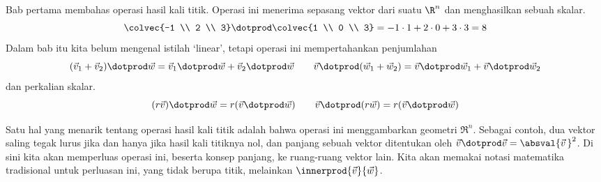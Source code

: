 \def\smashdp#1{{\setbox0=\hbox{$#1$}\dp0=0pt \box0\relax}}

Bab pertama membahas operasi hasil kali titik.
Operasi ini menerima sepasang vektor dari suatu $\R^n$ dan menghasilkan sebuah skalar.
\begin{equation*}
  \colvec{-1 \\ 2 \\ 3}\dotprod\colvec{1 \\ 0 \\ 3}
  =-1\cdot 1+2\cdot 0+3\cdot 3
  =8
\end{equation*}
Dalam bab itu kita belum mengenal istilah `linear', tetapi
operasi ini mempertahankan penjumlahan
\begin{equation*}
 (\vec{v}_1+\vec{v}_2)\dotprod\vec{w}=\vec{v}_1\dotprod\vec{w}
                                      +\vec{v}_2\dotprod\vec{w}
\qquad
 \vec{v}\dotprod(\vec{w}_1+\vec{w}_2)=\vec{v}\dotprod\vec{w}_1
                                      +\vec{v}\dotprod\vec{w}_2
\end{equation*}
dan perkalian skalar.
\begin{equation*}
 (r\vec{v})\dotprod\vec{w}=r(\vec{v}\dotprod\vec{w})
  \qquad
 \vec{v}\dotprod(r\vec{w})=r(\vec{v}\dotprod\vec{w})
\end{equation*}

Satu hal yang menarik tentang operasi hasil kali titik
adalah bahwa operasi ini menggambarkan geometri
$\Re^n\!$.
Sebagai contoh, dua vektor saling tegak lurus jika dan hanya jika
hasil kali titiknya nol, dan panjang sebuah vektor ditentukan oleh
$\vec{v}\dotprod\vec{v}=\absval{\vec{v}\,}^2$.
Di sini kita akan memperluas operasi ini, beserta konsep panjang,
ke ruang-ruang vektor lain.
Kita akan memakai notasi matematika tradisional untuk perluasan ini,
yang tidak berupa titik, melainkan
$\innerprod{\vec{v}}{\vec{w}}$.

